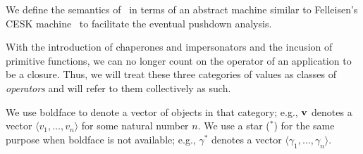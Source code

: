\documentclass{sigplanconf}
\begin{document}
We define the semantics of \chapcalc\ in terms of an abstract machine similar to Felleisen's CESK machine~\cite{felleisen1987calculus} to facilitate the eventual pushdown analysis.

With the introduction of chaperones and impersonators and the incusion of primitive functions, we can no longer count on the operator of an application to be a closure.
Thus, we will treat these three categories of values as classes of \emph{operators} and will refer to them collectively as such.

We use boldface to denote a vector of objects in that category; e.g., $\mathbf{v}$ denotes a vector $\langle v_1,\dots,v_n\rangle$ for some natural number $n$.
We use a star ($^*$) for the same purpose when boldface is not available; e.g., $\gamma^*$ denotes a vector $\langle\gamma_1,\dots,\gamma_n\rangle$.



\newcommand{\funarr}[2]{$\mathbf{#1}\rightarrow\mathbf{#2}$}
\end{document}
